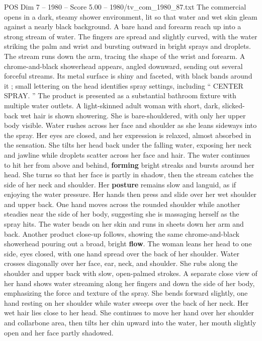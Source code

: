\begin{textsample}{POS Dim 7 – 1980 – Score 5.00 – 1980/tv\_com\_1980\_87.txt}  \label{ex:f7_pos_049}
The commercial opens in a dark, steamy shower environment, lit so that water and wet skin gleam against a nearly black background.
A bare hand and forearm reach up into a strong stream of water.
The fingers are spread and slightly curved, with the water striking the palm and wrist and bursting outward in bright sprays and droplets.
The stream runs down the arm, tracing the shape of the wrist and forearm.
A chrome-and-black showerhead appears, angled downward, sending out several forceful streams.
Its metal surface is shiny and faceted, with black bands around it ; small lettering on the head identifies spray settings, including “ CENTER SPRAY. ” The product is presented as a substantial bathroom fixture with multiple water outlets.
A light-skinned adult woman with short, dark, slicked-back wet hair is shown showering.
She is bare-shouldered, with only her upper body visible.
Water rushes across her face and shoulder as she leans sideways into the spray.
Her eyes are closed, and her expression is relaxed, almost absorbed in the sensation.
She tilts her head back under the falling water, exposing her neck and jawline while droplets scatter across her face and hair.
The water continues to hit her from above and behind, \textbf{forming} bright streaks and bursts around her head.
She turns so that her face is partly in shadow, then the stream catches the side of her neck and shoulder.
Her \textbf{posture} remains slow and languid, as if enjoying the water pressure.
Her hands then press and slide over her wet shoulder and upper back.
One hand moves across the rounded shoulder while another steadies near the side of her body, suggesting she is massaging herself as the spray hits.
The water beads on her skin and runs in sheets down her arm and back.
Another product close-up follows, showing the same chrome-and-black showerhead pouring out a broad, bright \textbf{flow}.
The woman leans her head to one side, eyes closed, with one hand spread over the back of her shoulder.
Water crosses diagonally over her face, ear, neck, and shoulder.
She rubs along the shoulder and upper back with slow, open-palmed strokes.
A separate close view of her hand shows water streaming along her fingers and down the side of her body, emphasizing the force and texture of the spray.
She bends forward slightly, one hand resting on her shoulder while water sweeps over the back of her neck.
Her wet hair lies close to her head.
She continues to move her hand over her shoulder and collarbone area, then tilts her chin upward into the water, her mouth slightly open and her face partly shadowed.

\end{textsample}
